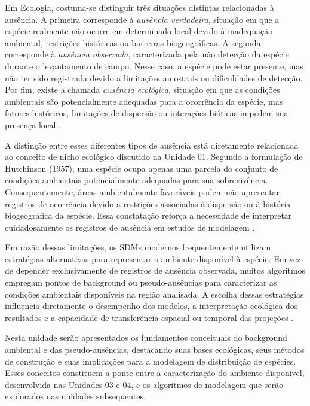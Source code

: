 Em Ecologia, costuma-se distinguir três situações distintas relacionadas à ausência. A primeira corresponde à \textit{ausência verdadeira}, situação em que a espécie realmente não ocorre em determinado local devido à inadequação ambiental, restrições históricas ou barreiras biogeográficas. A segunda corresponde à \textit{ausência observada}, caracterizada pela não detecção da espécie durante o levantamento de campo. Nesse caso, a espécie pode estar presente, mas não ter sido registrada devido a limitações amostrais ou dificuldades de detecção. Por fim, existe a chamada \textit{ausência ecológica}, situação em que as condições ambientais são potencialmente adequadas para a ocorrência da espécie, mas fatores históricos, limitações de dispersão ou interações bióticas impedem sua presença local \citep{soberon2007grinnellian}.

A distinção entre esses diferentes tipos de ausência está diretamente relacionada ao conceito de nicho ecológico discutido na Unidade 01. Segundo a formulação de Hutchinson (1957), uma espécie ocupa apenas uma parcela do conjunto de condições ambientais potencialmente adequadas para sua sobrevivência. Consequentemente, áreas ambientalmente favoráveis podem não apresentar registros de ocorrência devido a restrições associadas à dispersão ou à história biogeográfica da espécie. Essa constatação reforça a necessidade de interpretar cuidadosamente os registros de ausência em estudos de modelagem \citep{peterson2011ecological}.

Em razão dessas limitações, os SDMs modernos frequentemente utilizam estratégias alternativas para representar o ambiente disponível à espécie. Em vez de depender exclusivamente de registros de ausência observada, muitos algoritmos empregam pontos de background ou pseudo-ausências para caracterizar as condições ambientais disponíveis na região analisada. A escolha dessas estratégias influencia diretamente o desempenho dos modelos, a interpretação ecológica dos resultados e a capacidade de transferência espacial ou temporal das projeções \citep{elith2009species}.

Nesta unidade serão apresentados os fundamentos conceituais do background ambiental e das pseudo-ausências, destacando suas bases ecológicas, seus métodos de construção e suas implicações para a modelagem de distribuição de espécies. Esses conceitos constituem a ponte entre a caracterização do ambiente disponível, desenvolvida nas Unidades 03 e 04, e os algoritmos de modelagem que serão explorados nas unidades subsequentes.

